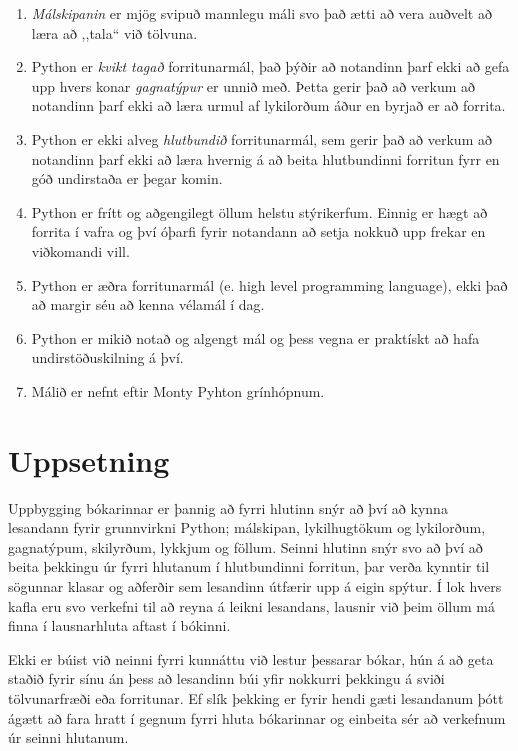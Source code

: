 \begin{enumerate}
	\item \textit{Málskipanin} er mjög svipuð mannlegu máli svo það ætti að vera auðvelt að læra að ,,tala“ við tölvuna.
	\item  Python er \textit{kvikt tagað} forritunarmál, það þýðir að notandinn þarf ekki að gefa upp hvers konar \textit{gagnatýpur} er unnið með. 
	Þetta gerir það að verkum að notandinn þarf ekki að læra urmul af lykilorðum áður en byrjað er að forrita.
	\item  Python er ekki alveg \textit{hlutbundið} forritunarmál, sem gerir það að verkum að notandinn þarf ekki að læra hvernig á að beita hlutbundinni forritun fyrr en góð undirstaða er þegar komin.
	\item Python er frítt og aðgengilegt öllum helstu stýrikerfum.
	Einnig er hægt að forrita í vafra og því óþarfi fyrir notandann að setja nokkuð upp frekar en viðkomandi vill.
	\item Python er æðra forritunarmál (e. high level programming language), ekki það að margir séu að kenna vélamál í dag.
	\item Python er mikið notað og algengt mál og þess vegna er praktískt að hafa undirstöðuskilning á því.
	\item Málið er nefnt eftir Monty Pyhton grínhópnum.
\end{enumerate}

\section{Uppsetning}
Uppbygging bókarinnar er þannig að fyrri hlutinn snýr að því að kynna lesandann fyrir grunnvirkni Python; málskipan, lykilhugtökum og lykilorðum, gagnatýpum, skilyrðum, lykkjum og föllum.
Seinni hlutinn snýr svo að því að beita þekkingu úr fyrri hlutanum í hlutbundinni forritun, þar verða kynntir til sögunnar klasar og aðferðir sem lesandinn útfærir upp á eigin spýtur.
Í lok hvers kafla eru svo verkefni til að reyna á leikni lesandans, lausnir við þeim öllum má finna í lausnarhluta aftast í bókinni.

Ekki er búist við neinni fyrri kunnáttu við lestur þessarar bókar, hún á að geta staðið fyrir sínu án þess að lesandinn búi yfir nokkurri þekkingu á sviði tölvunarfræði eða forritunar.
Ef slík þekking er fyrir hendi gæti lesandanum þótt ágætt að fara hratt í gegnum fyrri hluta bókarinnar og einbeita sér að verkefnum úr seinni hlutanum.

